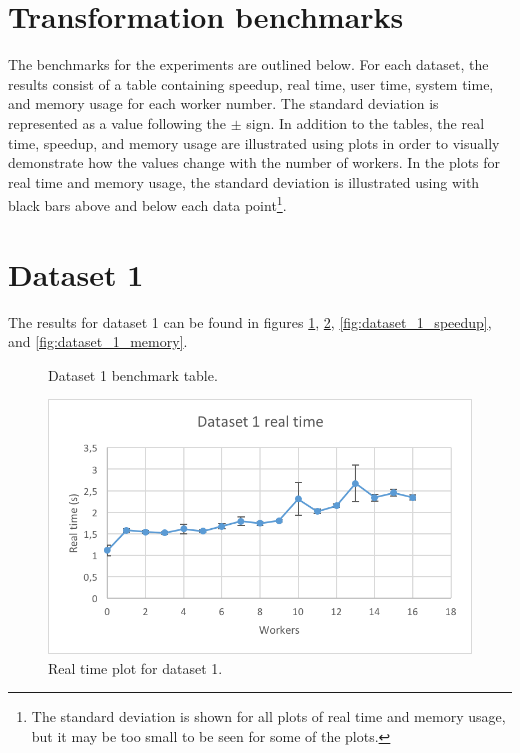 \section{Transformation benchmarks}
The benchmarks for the experiments are outlined below. For each dataset, the results consist of a table containing
speedup, real time, user time, system time, and memory usage for each worker number. The standard deviation is represented
as a value following the $\pm$ sign. In addition to the tables, the real time, speedup, and memory usage are illustrated
using plots in order to visually demonstrate how the values change with the number of workers. In the plots for real time
and memory usage, the standard deviation is illustrated using with black bars above and below each data point\footnote{
The standard deviation is shown for all plots of real time and memory usage, but it may be too small to be seen for some of the plots.}.

\section{Dataset 1}
The results for dataset 1 can be found in figures \ref{fig:dataset_1_table}, \ref{fig:dataset_1_real_time}, \ref{fig:dataset_1_speedup}, and \ref{fig:dataset_1_memory}.

\begin{figure}[ht]
\centering
{}
\caption[Dataset 1 benchmark table.]{Dataset 1 benchmark table.}
\label{fig:dataset_1_table}
\end{figure}

\begin{figure}[ht]
  \centering
  \includegraphics[width=120mm]{figures/dataset_1/dataset_1_real_time.png}
  \caption[Real time plot for dataset 1.]{Real time plot for dataset 1.}
  \label{fig:dataset_1_real_time}
\end{figure}

